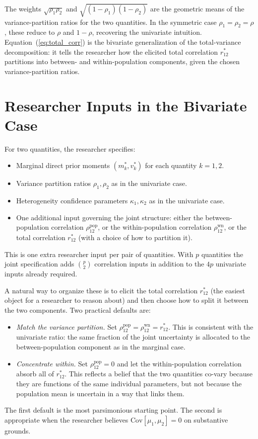 \documentclass[11pt,a4paper]{article}
\theoremstyle{definition}
\newcommand{\Cov}{\mathrm{Cov}}
\newcommand{\dpm}{m^*}
\newcommand{\dpv}{v^*}
\newcommand{\dpr}{r^*}
\begin{document}
The weights $\sqrt{\rho_1 \rho_2}$ and $\sqrt{(1-\rho_1)(1-\rho_2)}$
are the geometric means of the variance-partition ratios for the two
quantities. In the symmetric case $\rho_1 = \rho_2 = \rho$, these reduce
to $\rho$ and $1 - \rho$, recovering the univariate intuition.
Equation~(\ref{eq:total_corr}) is the bivariate generalization of the
total-variance decomposition: it tells the researcher how the elicited
total correlation $\dpr_{12}$ partitions into between- and
within-population components, given the chosen variance-partition ratios.

\section{Researcher Inputs in the Bivariate Case}

For two quantities, the researcher specifies:
\begin{itemize}
  \item Marginal direct prior moments $(\dpm_k, \dpv_k)$ for each
    quantity $k = 1, 2$.
  \item Variance partition ratios $\rho_1, \rho_2$ as in the univariate
    case.
  \item Heterogeneity confidence parameters $\kappa_1, \kappa_2$ as in
    the univariate case.
  \item One additional input governing the joint structure: either the
    between-population correlation $\rho^{\text{pop}}_{12}$, or the
    within-population correlation $\rho^{\text{wn}}_{12}$, or the total
    correlation $\dpr_{12}$ (with a choice of how to partition it).
\end{itemize}
This is one extra researcher input per pair of quantities. With $p$
quantities the joint specification adds $\binom{p}{2}$ correlation
inputs in addition to the $4p$ univariate inputs already required.

A natural way to organize these is to elicit the total correlation
$\dpr_{12}$ (the easiest object for a researcher to reason about) and
then choose how to split it between the two components. Two practical
defaults are:
\begin{itemize}
  \item \textit{Match the variance partition.} Set
    $\rho^{\text{pop}}_{12} = \rho^{\text{wn}}_{12} = \dpr_{12}$.
    This is consistent with the univariate ratio:
    the same fraction of the joint uncertainty is allocated to the
    between-population component as in the marginal case.
  \item \textit{Concentrate within.} Set
    $\rho^{\text{pop}}_{12} = 0$ and let the within-population
    correlation absorb all of $\dpr_{12}$. This reflects a belief that
    the two quantities co-vary because they are functions of the same
    individual parameters, but not because the population mean is
    uncertain in a way that links them.
\end{itemize}
The first default is the most parsimonious starting point. The second
is appropriate when the researcher believes $\Cov[\mu_1, \mu_2] = 0$ on
substantive grounds.
\end{document}
